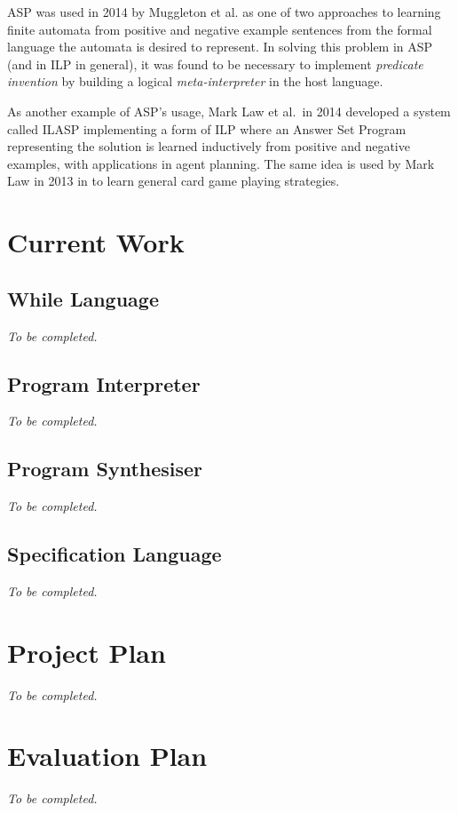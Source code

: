 \documentclass[a4paper,twoside,notitlepage]{article}
\begin{document}
ASP was used in 2014 by Muggleton et al.\cite{metagol} as one of two approaches to 
learning finite automata from positive and negative example sentences from the formal 
language the automata is desired to represent. In solving this problem in ASP (and in 
ILP in general), it was found to be necessary to implement \emph{predicate invention} 
by building a logical \emph{meta-interpreter} in the host language.

As another example of ASP's usage, Mark Law et al.\ in 2014 developed a system called 
ILASP\cite{ilasp} implementing a form of ILP where an Answer Set Program representing 
the solution is learned inductively from positive and negative examples, with 
applications in agent planning. The same idea is used by Mark Law in 2013 in 
\cite{law13} to learn general card game playing strategies.

\section{Current Work}

\subsection{While Language} \label{sec:outlng}
\emph{To be completed.}

\subsection{Program Interpreter}
\emph{To be completed.}

\subsection{Program Synthesiser}
\emph{To be completed.}

\subsection{Specification Language} \label{sec:inplng}
\emph{To be completed.}

\section{Project Plan}
\emph{To be completed.}

\section{Evaluation Plan}
\emph{To be completed.}
\end{document}
